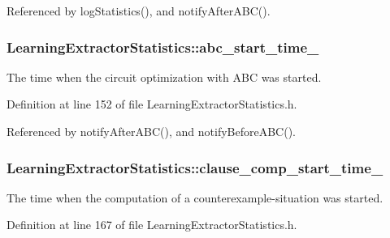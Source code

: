 Referenced by log\-Statistics(), and notify\-After\-A\-B\-C().

\hypertarget{classLearningExtractorStatistics_ac16b676d2eb3fe71af340233a37a9ca9}{
\subsubsection[{abc\-\_\-start\-\_\-time\-\_\-}]{ Learning\-Extractor\-Statistics\-::abc\-\_\-start\-\_\-time\-\_\-\hspace{0.3cm}{\ttfamily [protected]}}}\label{classLearningExtractorStatistics_ac16b676d2eb3fe71af340233a37a9ca9}


The time when the circuit optimization with A\-B\-C was started. 



Definition at line 152 of file Learning\-Extractor\-Statistics.\-h.



Referenced by notify\-After\-A\-B\-C(), and notify\-Before\-A\-B\-C().

\hypertarget{classLearningExtractorStatistics_a476eba034e9e2004d0fe0b2bdeafbd1e}{
\subsubsection[{clause\-\_\-comp\-\_\-start\-\_\-time\-\_\-}]{ Learning\-Extractor\-Statistics\-::clause\-\_\-comp\-\_\-start\-\_\-time\-\_\-\hspace{0.3cm}{\ttfamily [protected]}}}\label{classLearningExtractorStatistics_a476eba034e9e2004d0fe0b2bdeafbd1e}


The time when the computation of a counterexample-\/situation was started. 



Definition at line 167 of file Learning\-Extractor\-Statistics.\-h.



